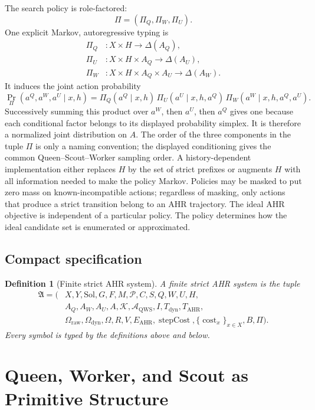 \documentclass[11pt,oneside]{book}
\newtheorem{definition}{Definition}[chapter]
\theoremstyle{remark}
\newcommand{\Sol}{\mathrm{Sol}}
\newcommand{\AQWS}{\mathcal A_{\mathrm{QWS}}}
\newcommand{\Om}{\Omega}
\DeclareMathOperator{\cost}{cost}
\begin{document}
The search policy is role-factored:
\[
\Pi=(\Pi_Q,\Pi_W,\Pi_U).
\]
One explicit Markov, autoregressive typing is
\begin{align*}
\Pi_Q&:X\times H\to\Delta(A_Q),\\
\Pi_U&:X\times H\times A_Q\to\Delta(A_U),\\
\Pi_W&:X\times H\times A_Q\times A_U\to\Delta(A_W).
\end{align*}
It induces the joint action probability
\[
\Pr_\Pi(a^Q,a^W,a^U\mid x,h)
=\Pi_Q(a^Q\mid x,h)\,
\Pi_U(a^U\mid x,h,a^Q)\,
\Pi_W(a^W\mid x,h,a^Q,a^U).
\]
Successively summing this product over $a^W$, then $a^U$, then $a^Q$
gives one because each conditional factor belongs to its displayed
probability simplex. It is therefore a normalized joint distribution on
$A$.
The order of the three components in the tuple $\Pi$ is only a naming
convention; the displayed conditioning gives the common
Queen--Scout--Worker sampling order. A history-dependent implementation
either replaces $H$ by the set of strict prefixes or augments $H$ with all
information needed to make the policy Markov. Policies may be masked to put
zero mass on known-incompatible actions; regardless of masking, only actions
that produce a strict transition belong to an AHR trajectory.
The ideal AHR objective is independent of a particular policy. The policy determines how the ideal candidate set is enumerated or approximated.

\section{Compact specification}

\begin{definition}[Finite strict AHR system]
A finite strict AHR system is the tuple
\[
\begin{aligned}
\mathfrak A=(&X,Y,\Sol,G,F,M,\mathcal P,C,S,Q,W,U,H,\\
&A_Q,A_W,A_U,A,\mathcal K,\AQWS,I,T_{\mathrm{dyn}},T_{\mathrm{AHR}},\\
&\Om_{\mathrm{raw}},\Om_{\mathrm{dyn}},\Om,R,V,E_{\mathrm{AHR}},
\operatorname{stepCost},\{\cost_x\}_{x\in X},B,\Pi).
\end{aligned}
\]
Every symbol is typed by the definitions above and below.
\end{definition}

\chapter{Queen, Worker, and Scout as Primitive Structure}
\end{document}
